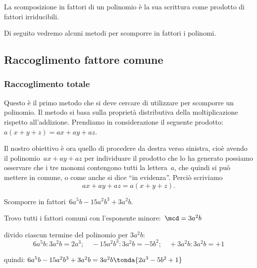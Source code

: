 \begin{definizione}
La scomposizione in fattori di un polinomio è la sua scrittura come prodotto 
di fattori irriducibili.
\end{definizione}

Di seguito vedremo alcuni metodi per scomporre in fattori i polinomi.


\subsection{Raccoglimento fattore comune}
\label{subsec:divpol_fattorecomune}

\subsubsection{Raccoglimento totale}

Questo è il primo metodo che si deve cercare di utilizzare per scomporre un 
polinomio.
Il metodo si basa sulla proprietà distributiva della moltiplicazione rispetto 
all'addizione.
Prendiamo in considerazione il seguente prodotto:~\(a(x+y+z)=ax+ay+az\).

Il nostro obiettivo è ora quello di procedere da destra verso sinistra, 
cioè avendo il polinomio~\(ax+ay+az\) per individuare il 
prodotto che lo ha generato possiamo osservare che i tre monomi contengono 
tutti la lettera~\(a\), che quindi si può mettere in comune,
o come anche si dice ``in evidenza''. Perciò scriviamo 
\[ax+ay+az=a(x+y+z).\]

 \begin{esempio}
Scomporre in fattori~\(6a^{5}b-15a^{2}b^{3}+3a^2b\).
 \begin{enumeratea}
 \item Trovo tutti i fattori comuni con l'esponente 
minore:~\(\mcd=3a^2b\)
 \item divido ciascun termine del polinomio per \(3a^2b\):
\[6a^{5}b : 3a^2b = 2a^{3}; \quad 
  -15a^{2}b^{3} : 3a^2b = -5b^{2}; \quad 
  +3a^2b : 3a^2b = +1\]
 \item quindi:\quad 
\(6a^{5}b-15a^{2}b^{3}+3a^2b=3a^{2}b\tonda{2a^{3}-5b^{2}+1}\)
 \end{enumeratea}
 \end{esempio}

